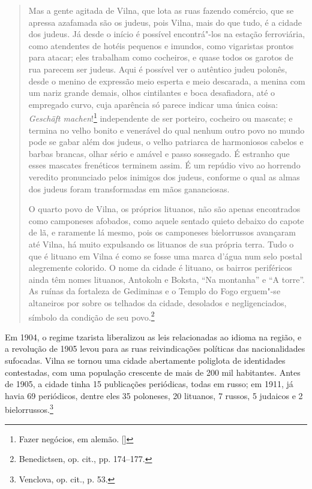 \begin{quote}
Mas a gente agitada de Vilna, que lota as ruas fazendo comércio, que se
apressa azafamada são os judeus, pois Vilna, mais do que tudo, é a
cidade dos judeus. Já desde o início é possível encontrá"-los na estação
ferroviária, como atendentes de hotéis pequenos e imundos, como
vigaristas prontos para atacar; eles trabalham como cocheiros, e quase
todos os garotos de rua parecem ser judeus. Aqui é possível ver o
autêntico judeu polonês, desde o menino de expressão meio esperta e meio
descarada, a menina com um nariz grande demais, olhos cintilantes e boca
desafiadora, até o empregado curvo, cuja aparência só parece indicar uma
única coisa: \textit{Geschäft machen}!\footnote{Fazer negócios, em alemão. []}
independente de ser porteiro, cocheiro ou mascate; e termina no velho
bonito e venerável do qual nenhum outro povo no mundo pode se gabar além
dos judeus, o velho patriarca de harmoniosos cabelos e barbas brancas,
olhar sério e amável e passo sossegado. É estranho que esses mascates
frenéticos terminem assim. É um repúdio vivo ao horrendo veredito
pronunciado pelos inimigos dos judeus, conforme o qual as almas dos
judeus foram transformadas em mãos gananciosas.

O quarto povo de Vilna, os próprios lituanos, não são apenas encontrados
como camponeses afobados, como aquele sentado quieto debaixo do capote
de lã, e raramente lá mesmo, pois os camponeses bielorrussos avançaram até
Vilna, há muito expulsando os lituanos de sua própria terra. Tudo o que
é lituano em Vilna é como se fosse uma marca d'água num selo postal
alegremente colorido. O nome da cidade é lituano, os bairros periféricos
ainda têm nomes lituanos, Antokoln e Boksta, ``Na montanha'' e ``A
torre''. As ruínas da fortaleza de Gediminas e o Templo do Fogo
erguem"-se altaneiros por sobre os telhados da cidade, desolados e
negligenciados, símbolo da condição de seu povo.\footnote{Benedictsen, op. cit., pp. 174--177.} 
\end{quote}

Em 1904, o regime tzarista liberalizou as leis relacionadas ao idioma na
região, e a revolução de 1905 levou para as ruas reivindicações
políticas das nacionalidades sufocadas. Vilna se tornou uma cidade
abertamente poliglota de identidades contestadas, com uma população
crescente de mais de 200 mil habitantes. Antes de 1905, a cidade tinha
15 publicações periódicas, todas em russo; em 1911, já havia 69
periódicos, dentre eles 35 poloneses, 20 lituanos, 7 russos, 5 judaicos
e 2 bielorrussos.\footnote{Venclova, op. cit., p. 53.}


